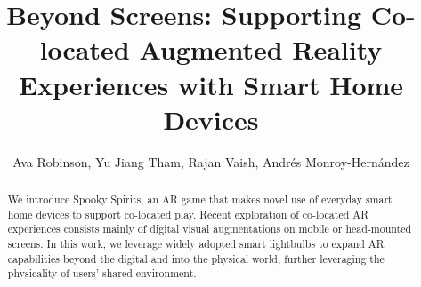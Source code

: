 \documentclass[sigconf, language=french,
language=german, language=spanish, language=english]{acmart}
\begin{document}
\title{Beyond Screens: Supporting Co-located Augmented Reality
Experiences with Smart Home Devices}


\author{Ava Robinson, Yu Jiang Tham, Rajan Vaish, Andrés Monroy-Hernández}

\renewcommand{\shortauthors}{Trovato and Tobin, et al.}

\begin{abstract}
We introduce Spooky Spirits, an AR game that makes novel use of
everyday smart home devices to support co-located play. Recent
exploration of co-located AR experiences consists mainly of digital
visual augmentations on mobile or head-mounted screens. In this
work, we leverage widely adopted smart lightbulbs to expand AR
capabilities beyond the digital and into the physical world, further
leveraging the physicality of users’ shared environment.

\end{abstract}
\end{document}
